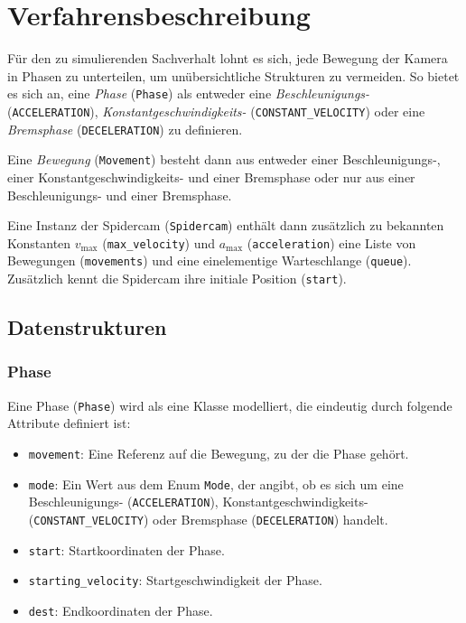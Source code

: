 \section{Verfahrensbeschreibung}
\label{sec:verfahrensbeschreibung}

Für den zu simulierenden Sachverhalt lohnt es sich, jede Bewegung der Kamera in Phasen zu unterteilen, um unübersichtliche Strukturen zu vermeiden.
So bietet es sich an, eine \emph{Phase} (\texttt{Phase}) als entweder eine \emph{Beschleunigungs-} (\texttt{ACCELERATION}), \emph{Konstantgeschwindigkeits-} (\texttt{CONSTANT\_VELOCITY}) oder eine \emph{Bremsphase} (\texttt{DECELERATION}) zu definieren.

Eine \emph{Bewegung} (\texttt{Movement}) besteht dann aus entweder einer Beschleunigungs-, einer Konstantgeschwindigkeits- und einer Bremsphase oder nur aus einer Beschleunigungs- und einer Bremsphase.

Eine Instanz der Spidercam (\texttt{Spidercam}) enthält dann zusätzlich zu bekannten Konstanten $v_{\max}$ (\texttt{max\_velocity}) und $a_{\max}$ (\texttt{acceleration}) eine Liste von Bewegungen (\texttt{movements}) und eine einelementige Warteschlange (\texttt{queue}).
Zusätzlich kennt die Spidercam ihre initiale Position (\texttt{start}).

\subsection{Datenstrukturen}
\label{ssec:datenstrukturen}


\subsubsection{Phase}
\label{sssec:phase}

Eine Phase (\texttt{Phase}) wird als eine Klasse modelliert, die eindeutig durch folgende Attribute definiert ist:
\begin{itemize}
    \item \texttt{movement}: Eine Referenz auf die Bewegung, zu der die Phase gehört.
    \item \texttt{mode}: Ein Wert aus dem Enum \texttt{Mode}, der angibt, ob es sich um eine Beschleunigungs- (\texttt{ACCELERATION}), Konstantgeschwindigkeits- (\texttt{CONSTANT\_VELOCITY}) oder Bremsphase (\texttt{DECELERATION}) handelt.
    \item \texttt{start}: Startkoordinaten der Phase.
    \item \texttt{starting\_velocity}: Startgeschwindigkeit der Phase.
    \item \texttt{dest}: Endkoordinaten der Phase.
\end{itemize}

